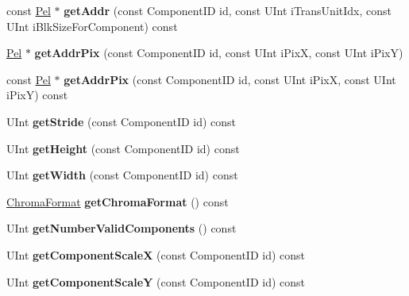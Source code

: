 \begin{DoxyCompactItemize}
const \hyperlink{_type_def_8h_af92141699657699b4b547be0c8517541}{Pel} $\ast$ {\bfseries get\+Addr} (const Component\+ID id, const U\+Int i\+Trans\+Unit\+Idx, const U\+Int i\+Blk\+Size\+For\+Component) const
\item 
\mbox{\label{class_t_com_yuv_ab3405ada6546b3267702149ee99e6cde}} 
\hyperlink{_type_def_8h_af92141699657699b4b547be0c8517541}{Pel} $\ast$ {\bfseries get\+Addr\+Pix} (const Component\+ID id, const U\+Int i\+PixX, const U\+Int i\+PixY)
\item 
\mbox{\label{class_t_com_yuv_a924af9d0bd12ee77fef8a8da22c6371a}} 
const \hyperlink{_type_def_8h_af92141699657699b4b547be0c8517541}{Pel} $\ast$ {\bfseries get\+Addr\+Pix} (const Component\+ID id, const U\+Int i\+PixX, const U\+Int i\+PixY) const
\item 
\mbox{\label{class_t_com_yuv_a2e25ff1d17aeb95e39a04fc937f4d0b6}} 
U\+Int {\bfseries get\+Stride} (const Component\+ID id) const
\item 
\mbox{\label{class_t_com_yuv_a6dc4d08e5a7c0bf5a8e368647b7650f4}} 
U\+Int {\bfseries get\+Height} (const Component\+ID id) const
\item 
\mbox{\label{class_t_com_yuv_a1905c3dc72eaa9113dab33549426fc5c}} 
U\+Int {\bfseries get\+Width} (const Component\+ID id) const
\item 
\mbox{\label{class_t_com_yuv_a8bb763211cf902f3ab548d2c8a602856}} 
\hyperlink{_type_def_8h_a4a6c51c10f2eb04abc7209db7caff39f}{Chroma\+Format} {\bfseries get\+Chroma\+Format} () const
\item 
\mbox{\label{class_t_com_yuv_a5b26fec3150347545dc99a39fa63e32a}} 
U\+Int {\bfseries get\+Number\+Valid\+Components} () const
\item 
\mbox{\label{class_t_com_yuv_aee3f4f151e32ff028c38c8f1c4043324}} 
U\+Int {\bfseries get\+Component\+ScaleX} (const Component\+ID id) const
\item 
\mbox{\label{class_t_com_yuv_a4e2e1403d0e88aed1a981674388375d2}} 
U\+Int {\bfseries get\+Component\+ScaleY} (const Component\+ID id) const
\end{DoxyCompactItemize}
